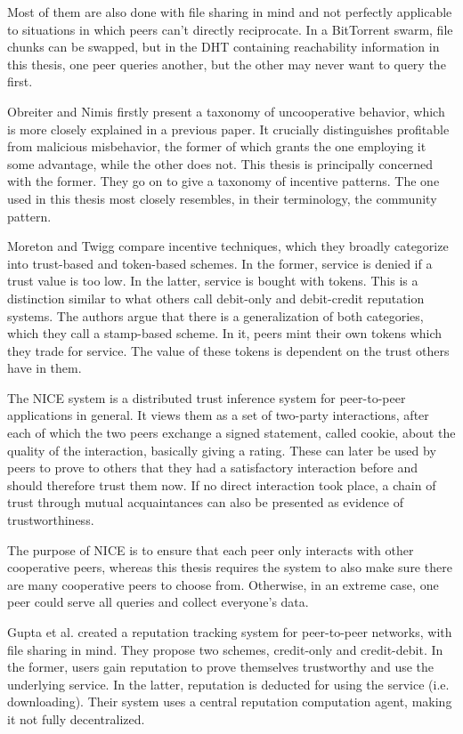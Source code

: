 Most of them are also done with file sharing in mind and not perfectly
applicable to situations in which peers can't directly reciprocate. In a
BitTorrent swarm, file chunks can be swapped, but in the DHT containing
reachability information in this thesis, one peer queries another, but the other
may never want to query the first.

Obreiter and Nimis\cite{obreiter2003taxonomy} firstly present a taxonomy of
uncooperative behavior, which is more closely explained in a previous
paper\cite{obreiter2003stimulating}. It crucially distinguishes profitable from
malicious misbehavior, the former of which grants the one employing it some
advantage, while the other does not. This thesis is principally concerned with
the former. They go on to give a taxonomy of incentive patterns. The one used in
this thesis most closely resembles, in their terminology, the community pattern.

Moreton and Twigg\cite{moreton2003trading} compare incentive techniques, which
they broadly categorize into trust-based and token-based schemes. In the former,
service is denied if a trust value is too low. In the latter, service is bought
with tokens. This is a distinction similar to what others call debit-only and
debit-credit reputation systems. The authors argue that there is a
generalization of both categories, which they call a stamp-based scheme. In it,
peers mint their own tokens which they trade for service. The value of these
tokens is dependent on the trust others have in them.

The NICE system\cite{sherwood2006cooperative} is a distributed trust inference
system for peer-to-peer applications in general. It views them as a set of
two-party interactions, after each of which the two peers exchange a signed
statement, called cookie, about the quality of the interaction, basically giving
a rating. These can later be used by peers to prove to others that they had a
satisfactory interaction before and should therefore trust them now. If no
direct interaction took place, a chain of trust through mutual acquaintances can
also be presented as evidence of trustworthiness.

The purpose of NICE is to ensure that each peer only interacts with other
cooperative peers, whereas this thesis requires the system to also make sure
there are many cooperative peers to choose from. Otherwise, in an extreme case,
one peer could serve all queries and collect everyone's data.

Gupta et al.\cite{gupta2003reputation} created a reputation tracking system for
peer-to-peer networks, with file sharing in mind. They propose two schemes,
credit-only and credit-debit. In the former, users gain reputation to prove
themselves trustworthy and use the underlying service. In the latter, reputation
is deducted for using the service (i.e. downloading). Their system uses a
central reputation computation agent, making it not fully decentralized.

